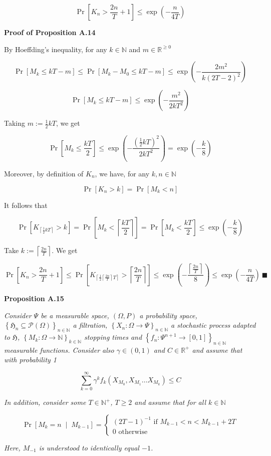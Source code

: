 \documentclass[a4paper]{article}
\newcommand{\Co}[1]{}
\newcommand{\AP}[1]{\left(#1\right)}
\newcommand{\AB}[1]{\left[#1\right]}
\newcommand{\AC}[1]{\left\{#1\right\}}
\newcommand{\ABM}[2]{\left[#1\;\middle\vert\;#2\right]}
\newcommand{\Ceil}[1]{\left\lceil #1 \right\rceil}
\newcommand{\Pa}[2]{\underset{#1}{\operatorname{Pr}}\AB{#2}}
\newcommand{\CP}[3]{\underset{#1}{\operatorname{Pr}}\ABM{#2}{#3}}
\newcommand{\Nats}{\mathbb{N}}
\newcommand{\Reals}{\mathbb{R}}
\newcommand{\PS}[1]{\mathcal{P}\AP{#1}} %
\newcommand{\Fi}{\mathfrak{H}}
\begin{document}
$$\Pa{}{K_n>\frac{2n}{T}+1}\leq\exp\AP{-\frac{n}{4T}}$$

\textbf{Proof of Proposition A.14}\Co{b}

By Hoeffding's inequality, for any $k\in\Nats$ and $m\in\Reals^{\geq0}$

$$\Pa{}{M_k\leq kT-m}\leq\Pa{}{M_k-M_0\leq kT-m}\leq\exp\AP{-\frac{2m^2}{k(2T-2)^2}}$$

$$\Pa{}{M_k\leq kT-m}\leq\exp\AP{-\frac{m^2}{2kT^2}}$$

Taking $m:=\frac{1}{2}kT$, we get

$$\Pa{}{M_k\leq \frac{kT}{2}}\leq\exp\AP{-\frac{\AP{\frac{1}{2}kT}^2}{2kT^2}}=\exp\AP{-\frac{k}{8}}$$

Moreover, by definition of $K_n$, we have, for any $k,n\in\Nats$

$$\Pa{}{K_n> k}=\Pa{}{M_k< n}$$

It follows that

$$\Pa{}{K_{\Ceil{\frac{1}{2}kT}}>k}=\Pa{}{M_k< \Ceil{\frac{kT}{2}}}=\Pa{}{M_k<\frac{kT}{2}}\leq\exp\AP{-\frac{k}{8}}$$

Take $k:=\Ceil{\frac{2n}{T}}$. We get

$$\Pa{}{K_n>\frac{2n}{T}+1}\leq\Pa{}{K_{\Ceil{\frac{1}{2}\Ceil{\frac{2n}{T}}T}}>\Ceil{\frac{2n}{T}}}\leq\exp\AP{-\frac{\Ceil{\frac{2n}{T}}}{8}}\leq\exp\AP{-\frac{n}{4T}}\ \blacksquare$$

\textbf{Proposition A.15}\Co{b}

\textit{Consider $\Psi$ be a measurable space, $(\Omega,P)$ a probability space, $\AC{\Fi_n\subseteq\PS{\Omega}}_{n\in\Nats}$ a filtration, $\AC{X_n:\Omega\rightarrow\Psi}_{n\in\Nats}$ a stochastic process adapted to $\Fi$, $\AC{M_k:\Omega\rightarrow\Nats}_{k\in\Nats}$ stopping times and $\AC{f_n:\Psi^{n+1}\rightarrow[0,1]}_{n\in\Nats}$ measurable functions. Consider also $\gamma\in(0,1)$ and $C\in\Reals^+$ and assume that with probability 1}\Co{i}

$$\sum_{k=0}^\infty \gamma^kf_k\AP{X_{M_0},X_{M_1}\ldots X_{M_{k}}} \leq C$$

\textit{In addition, consider some $T\in\Nats^+$, $T\geq2$ and assume that for all $k\in\Nats$}\Co{i}

$$\CP{}{M_{k}=n}{M_{k-1}}=\begin{cases} \AP{2T-1}^{-1} \text{ if } M_{k-1} < n < M_{k-1}+2T\\ 0 \text{ otherwise} \end{cases}$$

\textit{Here, $M_{-1}$ is understood to identically equal $-1$.}\Co{i}
\end{document}
